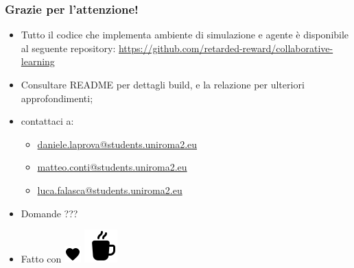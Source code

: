 \documentclass[compress]{beamer}
\begin{document}
\begin{frame}
    \frametitle{Grazie per l'attenzione!}
    \begin{itemize}
        \item Tutto il codice che implementa ambiente di simulazione e agente è disponibile al 
        seguente repository: \href{https://github.com/retarded-reward/collaborative-learning}{https://github.com/retarded-reward/collaborative-learning}
        \item Consultare README per dettagli build, e la relazione per ulteriori approfondimenti;
        \item contattaci a:
            \begin{itemize}
                \item \href{mailto:daniele.laprova@students.uniroma2.eu}{daniele.laprova@students.uniroma2.eu}
                \item \href{mailto:matteo.conti@students.uniroma2.eu}{matteo.conti@students.uniroma2.eu}
                \item \href{mailto:luca.falasca@students.uniroma2.eu}{luca.falasca@students.uniroma2.eu}
            \end{itemize}
        \item Domande ???
        \item Fatto con \includegraphics[scale=0.5]{figs/icons/icons8-heart-24.png} \includegraphics[scale=0.4]{figs/icons/icons8-coffee-cup-48.png}
    \end{itemize}
\end{frame}
\end{document}
